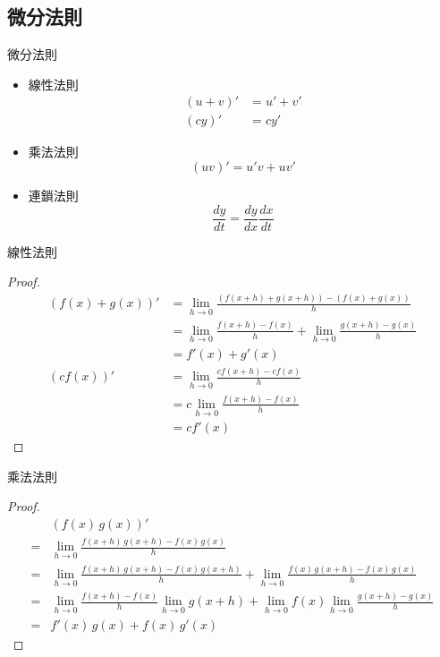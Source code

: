 \documentclass{beamer}
\begin{document}
\begin{CJK}{UTF8}{bsmi}
\subsection{微分法則}
\begin{frame}{微分法則}
  \begin{theorem}
    \begin{itemize}
      \item 線性法則
      \begin{align*}
	(u+v)' &= u'+v'\\
	(cy)'  &= cy'
      \end{align*}
      \item 乘法法則
      \[(uv)' = u'v + uv'\]
      \item 連鎖法則
      \[\frac{dy}{dt} = \frac{dy}{dx}\frac{dx}{dt}\]
    \end{itemize}
  \end{theorem}
\end{frame}

\begin{frame}{線性法則}
  \begin{proof}
    \begin{align*}
      (f(x) + g(x))' &= \lim_{h\to0}\frac{(f(x+h) + g(x+h)) - (f(x) + g(x))}{h}\\
		     &= \lim_{h\to0}\frac{f(x+h) - f(x)}{h} + \lim_{h\to0}\frac{g(x+h) - g(x)}{h}\\
		     &= f'(x) + g'(x)\\
      (cf(x))' &= \lim_{h\to0}\frac{cf(x+h) - cf(x)}{h}\\
	       &= c \lim_{h\to0}\frac{f(x+h) - f(x)}{h}\\
	       &= cf'(x)
    \end{align*}
  \end{proof}
\end{frame}

\begin{frame}{乘法法則}
  \begin{proof}
    \begin{align*}
       & (f(x)\,g(x))'\\
      =& \lim_{h\to0}\frac{f(x+h)\,g(x+h) - f(x)\,g(x)}{h}\\
      =& \lim_{h\to0}\tfrac{f(x+h)\,g(x+h) - f(x)\,g(x+h)}{h}
	 + \lim_{h\to0}\tfrac{f(x)\,g(x+h) - f(x)\,g(x)}{h}\\
      =& \lim_{h\to0}\tfrac{f(x+h) - f(x)}{h} \lim_{h\to0} g(x+h) + \lim_{h\to0} f(x) \lim_{h\to0}\tfrac{g(x+h) - g(x)}{h}\\
      =& f'(x)\,g(x) + f(x)\,g'(x)
    \end{align*}
  \end{proof}
\end{frame}


\end{CJK}
\end{document}
